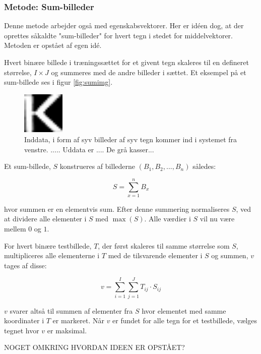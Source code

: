 \subsubsection{Metode: Sum-billeder}

Denne metode arbejder også med egenskabsvektorer. Her er idéen dog, at der oprettes såkaldte "sum-billeder" for hvert tegn i stedet for middelvektorer. Metoden er opstået af egen idé.

Hvert binære billede i træningssættet for et givent tegn skaleres til en defineret størrelse, $I \times J$ og summeres med de andre billeder i sættet. Et eksempel på et sum-billede ses i figur \vref{fig:sumimg}.

\begin{figure}[htp]
\centering
\includegraphics[width=2cm]{system/illu/sumimg.png} 
\caption{Inddata, i form af syv billeder af syv tegn kommer ind i systemet fra venstre. ..... Uddata er .... De grå kasser...}
\label{fig:sumimg}
\end{figure}

Et sum-billede, $S$ konstrueres af billederne $(B_{1},B_{2},...,B_{n})$ således:

\begin{displaymath}
	S = \sum_{x=1}^n{B_x}
\end{displaymath}

hvor summen er en elementvis sum. Efter denne summering normaliseres $S$, ved at dividere alle elementer i $S$ med $\max{(S)}$. Alle værdier i $S$ vil nu være mellem $0$ og $1$.

For hvert binære testbillede, $T$, der først skaleres til samme størrelse som $S$, multipliceres alle elementerne i $T$ med de tilsvarende elementer i $S$ og summen, $v$ tages af disse:

\begin{displaymath}
	v = \sum_{i=1}^I{\sum_{j=1}^J{T_{ij} \cdot S_{ij}}}
\end{displaymath}

$v$ svarer altså til summen af elementer fra $S$ hvor elementet med samme koordinater i $T$ er markeret. Når $v$ er fundet for alle tegn for et testbillede, vælges tegnet hvor $v$ er maksimal.

NOGET OMKRING HVORDAN IDEEN ER OPSTÅET?

